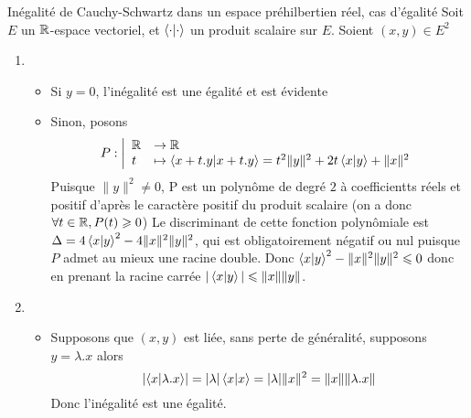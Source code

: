 \documentclass{article}
\renewenvironment{question_kholle}[2][ ]
{
	\subsection{\texorpdfstring{#2}{}}
	\notblank{#1}
	{
		\noindent #1
		\bigbreak
	}
	{}
	\begin{proof}
}
{
	\end{proof}
}
\begin{document}
\begin{question_kholle}{Inégalité de Cauchy-Schwartz dans un espace préhilbertien réel, cas d'égalité}
	Soit $E$ un $\mathbb R$-espace vectoriel, et $\braket{ \cdot | \cdot  }$ un produit scalaire sur $E$.
	Soient $(x, y) \in E^{2}$
	\begin{enumerate}
		\item \begin{itemize}[label=$\star$]
			      \item Si $y=0$, l'inégalité est une égalité et est évidente
			      \item Sinon, posons
			            $$
				            P:\left|\begin{array}{ll} \mathbb R &\to \mathbb R \\ t &\mapsto \braket{ x+t.y | x+t.y } = t^{2} \|y\|^{2} + 2 t \braket{ x | y }  + \|x\|^{2} \end{array}\right.
			            $$
			            Puisque $\|y\|^{2} \neq 0$, P est un polynôme de degré $2$ à coefficientts réels et positif d'après le caractère positif du produit scalaire (on a donc $\forall t \in \mathbb R, P(t)\geqslant 0$)
			            Le discriminant de cette fonction polynômiale est $\Delta = 4 \braket{ x | y }^{2} - 4 \|x\|^{2}\|y\|^{2}$, qui est obligatoirement négatif ou nul puisque $P$ admet au mieux une racine double.
			            Donc $\braket{ x | y }^{2} - \|x\|^{2}\|y\|^{2} \leqslant 0$ donc en prenant la racine carrée $|\braket{ x | y }| \leqslant \|x\|\|y\|$.
		      \end{itemize}
		\item \begin{itemize}[label=$\star$]
			      \item Supposons que $(x, y)$ est liée, sans perte de généralité, supposons $y = \lambda.x$ alors
			            $$
				            \lvert \braket{ x | \lambda.x } \rvert  = \lvert  \lambda \rvert  \braket{ x | x }  = \lvert  \lambda \rvert  \|x\|^{2} = \| x \| \| \lambda.x\|
			            $$
			            Donc l'inégalité est une égalité.


\end{itemize}
\end{enumerate}
\end{question_kholle}
\end{document}
